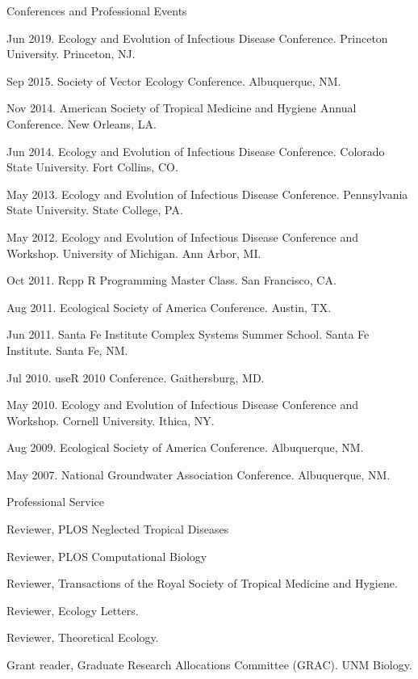 \documentclass{resume} %
\begin{document}


\begin{rSection}{Conferences and Professional Events}
\item Jun 2019. Ecology and Evolution of Infectious Disease Conference.
Princeton University. Princeton, NJ.
\item Sep 2015. Society of Vector Ecology Conference. Albuquerque, NM.
\item Nov 2014. American Society of Tropical Medicine and Hygiene Annual
Conference.  New Orleans, LA.
\item Jun 2014. Ecology and Evolution of Infectious Disease Conference.
Colorado State University.  Fort Collins, CO.
\item May 2013. Ecology and Evolution of Infectious Disease Conference.
Pennsylvania State University.  State College, PA.
\item May 2012. Ecology and Evolution of Infectious Disease Conference
and Workshop.  University of Michigan.  Ann Arbor, MI.
\item Oct 2011. Rcpp R Programming Master Class. San Francisco, CA.
\item Aug 2011. Ecological Society of America Conference. Austin, TX.
\item Jun 2011. Santa Fe Institute Complex Systems Summer School. Santa Fe Institute. Santa Fe, NM. 
\item Jul 2010. useR 2010 Conference. Gaithersburg, MD. 
\item May 2010. Ecology and Evolution of Infectious Disease Conference
and Workshop.  Cornell University.  Ithica, NY.
\item Aug 2009. Ecological Society of America Conference. Albuquerque, NM.
\item May 2007. National Groundwater Association Conference. Albuquerque, NM. 
\end{rSection}

\begin{rSection}{Professional Service}
\item Reviewer, PLOS Neglected Tropical Diseases
\item Reviewer, PLOS Computational Biology
\item Reviewer, Transactions of the Royal Society of Tropical Medicine and Hygiene.
\item Reviewer, Ecology Letters.
\item Reviewer, Theoretical Ecology.
\item Grant reader, Graduate Research Allocations Committee (GRAC). UNM Biology.
\end{rSection}
\end{document}
